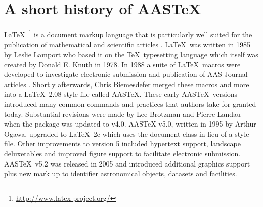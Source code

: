 \documentclass[linenumbers,trackchanges]{aastex701}
\newcommand\aastex{AAS\TeX}
\newcommand\latex{La\TeX}
\begin{document}


\section{A short history of AASTeX} 

\latex\ \footnote{\url{http://www.latex-project.org/}} is a document markup
language that is particularly well suited for the publication of
mathematical and scientific articles \citep{lamport94}. \latex\ was written
in 1985 by Leslie Lamport who based it on the \TeX\ typesetting language
which itself was created by Donald E. Knuth in 1978.  In 1988 a suite of
\latex\ macros were developed to investigate electronic submission and
publication of AAS Journal articles \citep{1989BAAS...21..780H}.  Shortly
afterwards, Chris Biemesdefer merged these macros and more into a \latex\
2.08 style file called \aastex.  These early \aastex\ versions introduced
many common commands and practices that authors take for granted today.
Substantial revisions
were made by Lee Brotzman and Pierre Landau when the package was updated to
v4.0.  AASTeX v5.0, written in 1995 by Arthur Ogawa, upgraded to \latex\ 2e
which uses the document class in lieu of a style file.  Other improvements
to version 5 included hypertext support, landscape deluxetables and
improved figure support to facilitate electronic submission.  
\aastex\ v5.2 was released in 2005 and introduced additional graphics
support plus new mark up to identifier astronomical objects, datasets and
facilities.
\end{document}
